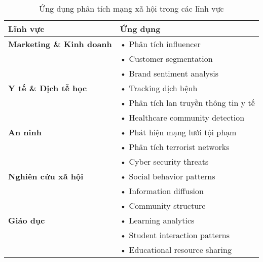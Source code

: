\documentclass{article}
\begin{document}
\begin{table}[h!]
\begin{tabularx}{\textwidth}{|X|X|}
\hline
\textbf{Lĩnh vực} & \textbf{Ứng dụng} \\
\hline
\textbf{Marketing \& Kinh doanh} & • Phân tích influencer \\
& • Customer segmentation \\
& • Brand sentiment analysis \\
\hline
\textbf{Y tế \& Dịch tễ học} & • Tracking dịch bệnh \\
& • Phân tích lan truyền thông tin y tế \\
& • Healthcare community detection \\
\hline
\textbf{An ninh} & • Phát hiện mạng lưới tội phạm \\
& • Phân tích terrorist networks \\
& • Cyber security threats \\
\hline
\textbf{Nghiên cứu xã hội} & • Social behavior patterns \\
& • Information diffusion \\
& • Community structure \\
\hline
\textbf{Giáo dục} & • Learning analytics \\
& • Student interaction patterns \\
& • Educational resource sharing \\
\hline
\end{tabularx}
\caption{Ứng dụng phân tích mạng xã hội trong các lĩnh vực}
\end{table}
\end{document}
